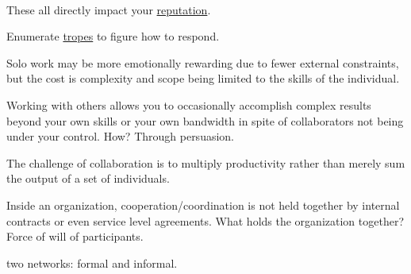 \ \\


These all directly impact your 
\hyperref[sec:reputation]{reputation}.

Enumerate \hyperref[sec:tropes]{tropes} to figure how to respond.


Solo work may be more emotionally rewarding due to fewer external constraints, but the cost is complexity and scope being limited to the skills of the individual. 

Working with others allows you to occasionally accomplish complex results beyond your own skills or your own bandwidth in spite of collaborators not being under your control. How? Through persuasion. 

The challenge of collaboration is to multiply productivity rather than merely sum the output of a set of individuals. 

Inside an organization, cooperation/coordination is not held together by internal contracts or even service level agreements. What holds the organization together? Force of will of participants. 

two networks: formal and informal.